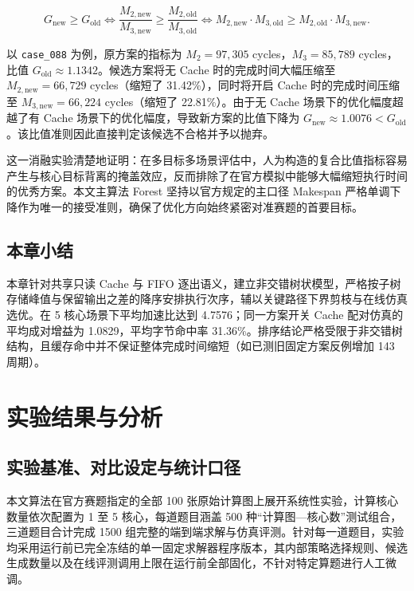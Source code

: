 \documentclass[anonymous,withtoc]{gmcm2026}
\begin{document}
\begin{equation}
G_{\mathrm{new}} \ge G_{\mathrm{old}} \iff \frac{M_{2, \mathrm{new}}}{M_{3, \mathrm{new}}} \ge \frac{M_{2, \mathrm{old}}}{M_{3, \mathrm{old}}} \iff M_{2, \mathrm{new}} \cdot M_{3, \mathrm{old}} \ge M_{2, \mathrm{old}} \cdot M_{3, \mathrm{new}}.
\end{equation}

以 \texttt{case\_088} 为例，原方案的指标为 \(M_2 = 97{,}305\) cycles，\(M_3 = 85{,}789\) cycles，比值 \(G_{\mathrm{old}} \approx 1.1342\)。候选方案将无 Cache 时的完成时间大幅压缩至 \(M_{2, \mathrm{new}} = 66{,}729\) cycles（缩短了 31.42\%），同时将开启 Cache 时的完成时间压缩至 \(M_{3, \mathrm{new}} = 66{,}224\) cycles（缩短了 22.81\%）。由于无 Cache 场景下的优化幅度超越了有 Cache 场景下的优化幅度，导致新方案的比值下降为 \(G_{\mathrm{new}} \approx 1.0076 < G_{\mathrm{old}}\)。该比值准则因此直接判定该候选不合格并予以抛弃。

这一消融实验清楚地证明：在多目标多场景评估中，人为构造的复合比值指标容易产生与核心目标背离的掩盖效应，反而排除了在官方模拟中能够大幅缩短执行时间的优秀方案。本文主算法 Forest 坚持以官方规定的主口径 Makespan 严格单调下降作为唯一的接受准则，确保了优化方向始终紧密对准赛题的首要目标。

\subsection{本章小结}

本章针对共享只读 Cache 与 FIFO 逐出语义，建立非交错树状模型，严格按子树存储峰值与保留输出之差的降序安排执行次序，辅以关键路径下界剪枝与在线仿真选优。在 5 核心场景下平均加速比达到 4.7576；同一方案开关 Cache 配对仿真的平均成对增益为 1.0829，平均字节命中率 31.36\%。排序结论严格受限于非交错树结构，且缓存命中并不保证整体完成时间缩短（如已测旧固定方案反例增加 143 周期）。


\section{实验结果与分析}

\subsection{实验基准、对比设定与统计口径}

本文算法在官方赛题指定的全部 100 张原始计算图上展开系统性实验，计算核心数量依次配置为 1 至 5 核心，每道题目涵盖 500 种``计算图---核心数''测试组合，三道题目合计完成 1500 组完整的端到端求解与仿真评测。针对每一道题目，实验均采用运行前已完全冻结的单一固定求解器程序版本，其内部策略选择规则、候选生成数量以及在线评测调用上限在运行前全部固化，不针对特定算题进行人工微调。
\end{document}
